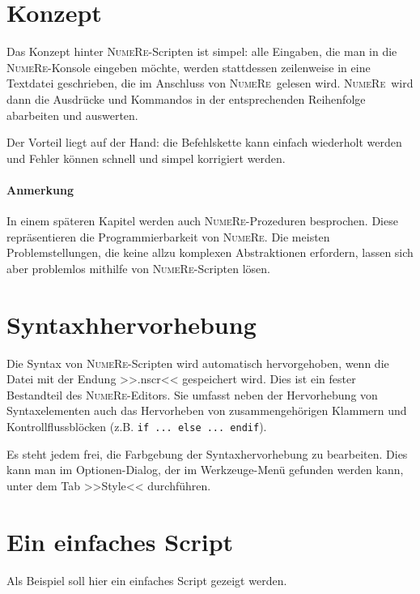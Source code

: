 \documentclass[DIV=14,headsepline,footsepline]{scrbook}
\newcommand{\NR}{\textsc{Nu\-me\-Re}}
\begin{document}
			\section{Konzept}
				Das Konzept hinter \NR-Scripten ist simpel: alle Eingaben, die man in die \NR-Konsole eingeben möchte, werden stattdessen zeilenweise in eine Textdatei geschrieben, die im Anschluss von \NR\ gelesen wird. \NR\ wird dann die Ausdrücke und Kommandos in der entsprechenden Reihenfolge abarbeiten und auswerten.
				
				Der Vorteil liegt auf der Hand: die Befehlskette kann einfach wiederholt werden und Fehler können schnell und simpel korrigiert werden.
				\paragraph{Anmerkung}
					In einem späteren Kapitel werden auch \NR-Prozeduren besprochen. Diese repräsentieren die Programmierbarkeit von \NR. Die meisten Problemstellungen, die keine allzu komplexen Abstraktionen erfordern, lassen sich aber problemlos mithilfe von \NR-Scripten lösen.
				
			\section{Syntaxhhervorhebung}
				Die Syntax von \NR-Scripten wird automatisch hervorgehoben, wenn die Datei mit der Endung >>.nscr<< gespeichert wird. Dies ist ein fester Bestandteil des \NR-Editors. Sie umfasst neben der Hervorhebung von Syntaxelementen auch das Hervorheben von zusammengehörigen Klammern und Kontrollflussblöcken (z.B. \verb+if ... else ... endif+).
				
				Es steht jedem frei, die Farbgebung der Syntaxhervorhebung zu bearbeiten. Dies kann man im Optionen-Dialog, der im Werkzeuge-Menü gefunden werden kann, unter dem Tab >>Style<< durchführen. 
			\section{Ein einfaches Script}
				Als Beispiel soll hier ein einfaches Script gezeigt werden.
				
\end{document}

